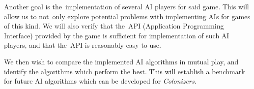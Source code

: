 Another goal is the~implementation of several AI players for said game. This will
allow us to not~only explore potential problems with implementing AIs for games
of this kind. We will also verify that the~API (Application Programming Interface)
provided by the game is sufficient for implementation of such AI players, and that
the~API is reasonably easy to use.

We then wish to compare the implemented AI algorithms in mutual play,
and identify the algorithms which perform the best. This will establish a benchmark
for future AI algorithms which can be developed for \emph{Colonizers}.
